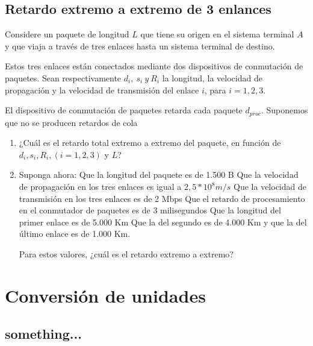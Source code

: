 \documentclass[12pt]{report}
\begin{document}
\begin{samepage}
	\section{Retardo extremo a extremo de 3 enlances \sfive}

	Considere un paquete de longitud $L$ que tiene su origen en el sistema terminal $A$ y que viaja a través de tres enlaces hasta un sistema terminal de destino.

	Estos tres enlaces están conectados mediante dos dispositivos de conmutación de paquetes. Sean respectivamente $d_i,\ s_i\ y\ R_i$ la longitud, la velocidad de propagación y la velocidad de transmisión del enlace $i$, para $i = 1, 2, 3$.

	El dispositivo de conmutación de paquetes retarda cada paquete $d_{proc}$. Suponemos que no se producen retardos de cola

	\begin{enumerate}
		\item ¿Cuál es el retardo total extremo a extremo del paquete, en función de $d_i, s_i, R_i, (i = 1, 2, 3)$ y $L$?
		\item Suponga ahora:
		      \subitem Que la longitud del paquete es de 1.500 B
		      \subitem Que la velocidad de propagación en los tres enlaces es igual a $2,5 * 10^{8} m/s$
		      \subitem Que la velocidad de transmisión en los tres enlaces es de 2 Mbps
		      \subitem Que el retardo de procesamiento en el conmutador de paquetes es de 3 milisegundos
		      \subitem Que la longitud del primer enlace es de 5.000 Km
		      \subitem Que la del segundo es de 4.000 Km y que la del último enlace es de 1.000 Km.

		      Para estos valores, ¿cuál es el retardo extremo a extremo?
	\end{enumerate}
\end{samepage}

\section{Conversión de unidades}

\begin{exer}
	\subsection{something... \sfour}

\end{exer}
\end{document}
